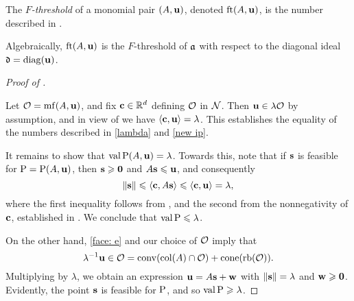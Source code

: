 \documentclass[11pt]{amsart}
\begin{document}
\begin{definition}
   The \emph{$F$-threshold} of a monomial pair $(A, \mathbf{u})$, denoted $\operatorname{ft}(A, \mathbf{u})$, is the number described in . 
\end{definition}

Algebraically, $\operatorname{ft}(A, \mathbf{u})$ is the $F$-threshold of $\mathfrak{a}$ with respect to the diagonal ideal $\mathfrak{d} = \operatorname{diag}(\mathbf{u})$.

\begin{proof}[Proof of ]
   \ 

   Let $\mathcal{O} = \operatorname{mf}(A,\mathbf{u})$, and fix $\mathbf{c} \in \mathbb{R}^d$ defining $\mathcal{O}$ in $\mathcal{N}$.
   Then $\mathbf{u} \in \lambda \mathcal{O}$ by assumption, and in view of  we have $\langle \mathbf{c}, \mathbf{u} \rangle = \lambda$.
   This establishes the equality of the numbers described in \eqref{lambda} and \eqref{new ip}.

   It remains to show that $\operatorname{val} \mathrm{P}(A, \mathbf{u}) = \lambda$.
   Towards this, note that if $\mathbf{s}$ is feasible for $\mathrm{P} = \mathrm{P}(A, \mathbf{u})$, then $\mathbf{s}\geqslant \mathbf{0}$ and $A \mathbf{s} \leqslant \mathbf{u}$, and consequently
   \[\| \mathbf{s} \| \leqslant \langle \mathbf{c}, A \mathbf{s} \rangle \leqslant \langle \mathbf{c}, \mathbf{u} \rangle = \lambda,\]
   where the first inequality follows from , and the second from the nonnegativity of $\mathbf{c}$, established in .
   We conclude that $\operatorname{val} \mathrm{P} \leqslant \lambda$.

   On the other hand, \eqref{face: e} and our choice of $\mathcal{O}$ imply that
   \begin{equation}\label{cone containment: e}
      \lambda^{-1} \mathbf{u} \in \mathcal{O} = \operatorname{conv}(\operatorname{col}(A) \cap \mathcal{O}) + \operatorname{cone}(\operatorname{rb}(\mathcal{O})).
   \end{equation}
   Multiplying by $\lambda$, we obtain an expression $\mathbf{u} = A \mathbf{s} + \mathbf{w}$ with $\| \mathbf{s} \| = \lambda$ and $\mathbf{w} \geqslant \mathbf{0}$.
   Evidently, the point $\mathbf{s}$ is feasible for $\mathrm{P}$, and so $\operatorname{val} \mathrm{P} \geqslant \lambda$.
\end{proof}
\end{document}

